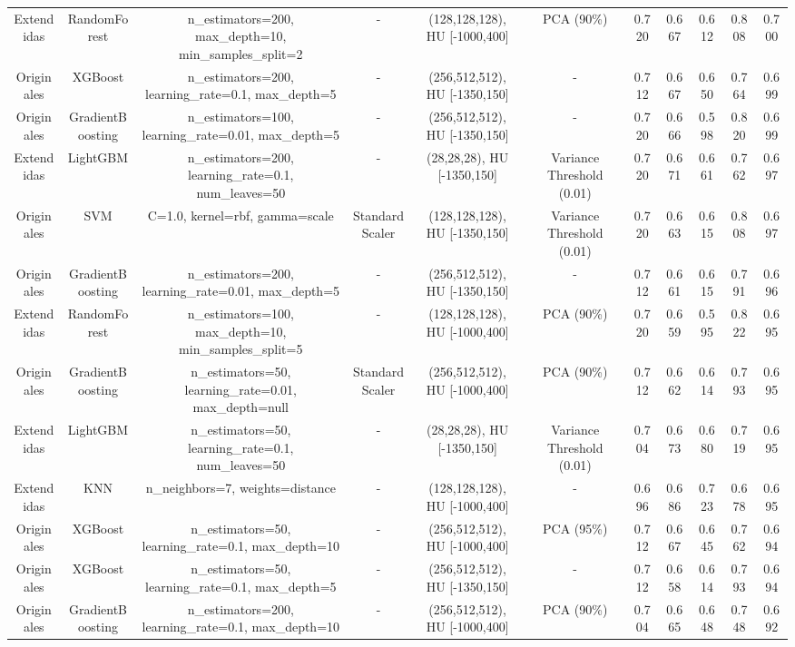 \begin{sidewaystable}[!htbp]
{\begin{tabular}{ccccccccccc}
Extendidas & RandomForest & n\_estimators=200, max\_depth=10, min\_samples\_split=2 & - & (128,128,128), HU [-1000,400] & PCA (90\%) & 0.720 & 0.667 & 0.612 & 0.808 & 0.700 \\
Originales & XGBoost & n\_estimators=200, learning\_rate=0.1, max\_depth=5 & - & (256,512,512), HU [-1350,150] & - & 0.712 & 0.667 & 0.650 & 0.764 & 0.699 \\
Originales & GradientBoosting & n\_estimators=100, learning\_rate=0.01, max\_depth=5 & - & (256,512,512), HU [-1350,150] & - & 0.720 & 0.666 & 0.598 & 0.820 & 0.699 \\
Extendidas & LightGBM & n\_estimators=200, learning\_rate=0.1, num\_leaves=50 & - & (28,28,28), HU [-1350,150] & Variance Threshold (0.01) & 0.720 & 0.671 & 0.661 & 0.762 & 0.697 \\
Originales & SVM & C=1.0, kernel=rbf, gamma=scale & StandardScaler & (128,128,128), HU [-1350,150] & Variance Threshold (0.01) & 0.720 & 0.663 & 0.615 & 0.808 & 0.697 \\
Originales & GradientBoosting & n\_estimators=200, learning\_rate=0.01, max\_depth=5 & - & (256,512,512), HU [-1350,150] & - & 0.712 & 0.661 & 0.615 & 0.791 & 0.696 \\
Extendidas & RandomForest & n\_estimators=100, max\_depth=10, min\_samples\_split=5 & - & (128,128,128), HU [-1000,400] & PCA (90\%) & 0.720 & 0.659 & 0.595 & 0.822 & 0.695 \\
Originales & GradientBoosting & n\_estimators=50, learning\_rate=0.01, max\_depth=null & StandardScaler & (256,512,512), HU [-1000,400] & PCA (90\%) & 0.712 & 0.662 & 0.614 & 0.793 & 0.695 \\
Extendidas & LightGBM & n\_estimators=50, learning\_rate=0.1, num\_leaves=50 & - & (28,28,28), HU [-1350,150] & Variance Threshold (0.01) & 0.704 & 0.673 & 0.680 & 0.719 & 0.695 \\
Extendidas & KNN & n\_neighbors=7, weights=distance & - & (128,128,128), HU [-1000,400] & - & 0.696 & 0.686 & 0.723 & 0.678 & 0.695 \\
Originales & XGBoost & n\_estimators=50, learning\_rate=0.1, max\_depth=10 & - & (256,512,512), HU [-1000,400] & PCA (95\%) & 0.712 & 0.667 & 0.645 & 0.762 & 0.694 \\
Originales & XGBoost & n\_estimators=50, learning\_rate=0.1, max\_depth=5 & - & (256,512,512), HU [-1350,150] & - & 0.712 & 0.658 & 0.614 & 0.793 & 0.694 \\
Originales & GradientBoosting & n\_estimators=200, learning\_rate=0.1, max\_depth=10 & - & (256,512,512), HU [-1000,400] & PCA (90\%) & 0.704 & 0.665 & 0.648 & 0.748 & 0.692 \\

\end{tabular}}
\end{sidewaystable}
